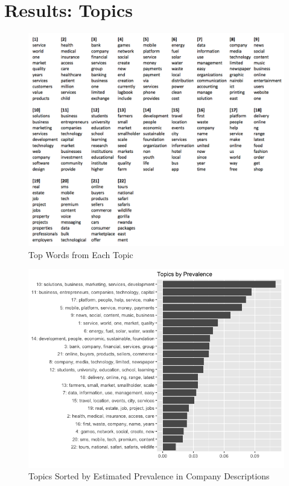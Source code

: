 \documentclass[12pt]{article}
\begin{document}
\FloatBarrier

\section{Results: Topics}


\begin{figure} [!h]
\centering
\includegraphics[scale=0.9]{Topics}
\caption{Top Words from Each Topic}
\end{figure}

\begin{figure} [!htb]
\centering
\includegraphics[scale=0.6]{topic_prevalence}
\caption{Topics Sorted by Estimated Prevalence in Company Descriptions}
\end{figure}
\end{document}
